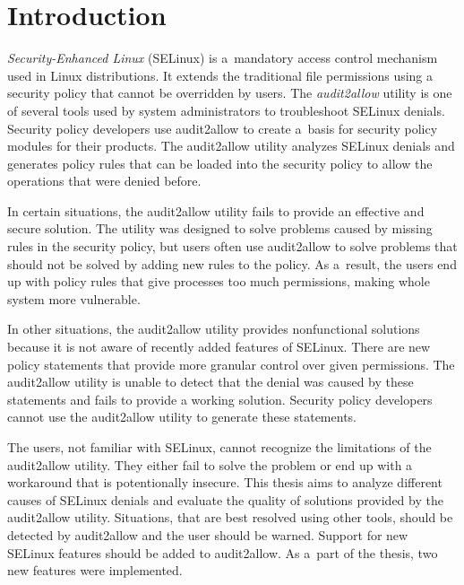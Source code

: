 \chapter{Introduction}

\emph{Security-Enhanced Linux} (SELinux) is a~mandatory access control mechanism
used in Linux distributions. It extends the traditional file permissions using a
security policy that cannot be overridden by users. The \emph{audit2allow}
utility is one of several tools used by system administrators to troubleshoot
SELinux denials. Security policy developers use audit2allow to create a~basis
for security policy modules for their products. The audit2allow utility analyzes
SELinux denials and generates policy rules that can be loaded into the security
policy to allow the operations that were denied before.

In certain situations, the audit2allow utility fails to provide an effective and
secure solution. The utility was designed to solve problems caused by missing
rules in the security policy, but users often use audit2allow to solve problems
that should not be solved by adding new rules to the policy. As a~result, the
users end up with policy rules that give processes too much permissions, making
whole system more vulnerable.

In other situations, the audit2allow utility provides nonfunctional solutions
because it is not aware of recently added features of SELinux. There are new
policy statements that provide more granular control over given permissions. The
audit2allow utility is unable to detect that the denial was caused by these
statements and fails to provide a working solution. Security policy developers
cannot use the audit2allow utility to generate these statements.

The users, not familiar with SELinux, cannot recognize the limitations of the
audit2allow utility. They either fail to solve the problem or end up with a
workaround that is potentionally insecure.
This thesis aims to analyze different causes of SELinux denials and evaluate the
quality of solutions provided by the audit2allow utility. Situations, that are
best resolved using other tools, should be detected by audit2allow and the user
should be warned. Support for new SELinux features should be added to
audit2allow. As a~part of the thesis, two new features were implemented.

